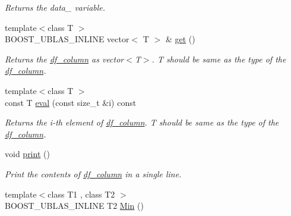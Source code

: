 \begin{DoxyCompactItemize}
\begin{DoxyCompactList}\small\item\em Returns the data\+\_\+ variable. \end{DoxyCompactList}\item 
{\footnotesize template$<$class T $>$ }\\B\+O\+O\+S\+T\+\_\+\+U\+B\+L\+A\+S\+\_\+\+I\+N\+L\+I\+NE vector$<$ T $>$ \& \hyperlink{classboost_1_1numeric_1_1ublas_1_1df__column_a166ffc39d030e2773661bd24f79f66c3}{get} ()\hypertarget{classboost_1_1numeric_1_1ublas_1_1df__column_a166ffc39d030e2773661bd24f79f66c3}{}\label{classboost_1_1numeric_1_1ublas_1_1df__column_a166ffc39d030e2773661bd24f79f66c3}

\begin{DoxyCompactList}\small\item\em Returns the \hyperlink{classboost_1_1numeric_1_1ublas_1_1df__column}{df\+\_\+column} as vector$<$\+T$>$. T should be same as the type of the \hyperlink{classboost_1_1numeric_1_1ublas_1_1df__column}{df\+\_\+column}. \end{DoxyCompactList}\item 
{\footnotesize template$<$class T $>$ }\\const T \hyperlink{classboost_1_1numeric_1_1ublas_1_1df__column_ad0ef5ad76e5ac4b096c70a8c0bd29fbf}{eval} (const size\+\_\+t \&i) const \hypertarget{classboost_1_1numeric_1_1ublas_1_1df__column_ad0ef5ad76e5ac4b096c70a8c0bd29fbf}{}\label{classboost_1_1numeric_1_1ublas_1_1df__column_ad0ef5ad76e5ac4b096c70a8c0bd29fbf}

\begin{DoxyCompactList}\small\item\em Returns the i-\/th element of \hyperlink{classboost_1_1numeric_1_1ublas_1_1df__column}{df\+\_\+column}. T should be same as the type of the \hyperlink{classboost_1_1numeric_1_1ublas_1_1df__column}{df\+\_\+column}. \end{DoxyCompactList}\item 
void \hyperlink{classboost_1_1numeric_1_1ublas_1_1df__column_abacd7ce00ef0a7e3d89e099fefa2ba64}{print} ()\hypertarget{classboost_1_1numeric_1_1ublas_1_1df__column_abacd7ce00ef0a7e3d89e099fefa2ba64}{}\label{classboost_1_1numeric_1_1ublas_1_1df__column_abacd7ce00ef0a7e3d89e099fefa2ba64}

\begin{DoxyCompactList}\small\item\em Print the contents of \hyperlink{classboost_1_1numeric_1_1ublas_1_1df__column}{df\+\_\+column} in a single line. \end{DoxyCompactList}\item 
{\footnotesize template$<$class T1 , class T2 $>$ }\\B\+O\+O\+S\+T\+\_\+\+U\+B\+L\+A\+S\+\_\+\+I\+N\+L\+I\+NE T2 \hyperlink{classboost_1_1numeric_1_1ublas_1_1df__column_aaa29e332cec5a5295f58a2e8ea6607b7}{Min} ()\hypertarget{classboost_1_1numeric_1_1ublas_1_1df__column_aaa29e332cec5a5295f58a2e8ea6607b7}{}\label{classboost_1_1numeric_1_1ublas_1_1df__column_aaa29e332cec5a5295f58a2e8ea6607b7}


\end{DoxyCompactItemize}
